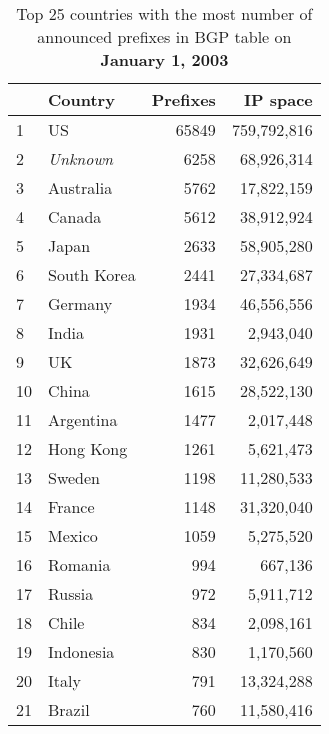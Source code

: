 
\begin{table*}[tp]
\begin{minipage}[t]{0.48\textwidth}
	\begin{center}
	\caption{Top 25 countries with the most number of announced prefixes in BGP table on \textbf{January 1, 2003}}
	\label{tab:top25 bgp prefixes 2003}
	\begin{tabular}{|l||l|r|r|} %
		\hline
		&      \bf Country		&    Prefixes   &       IP space 		\tabularnewline \hline 
1       &       US      		&       65849   &       759,792,816     \tabularnewline %
2       &       \emph{Unknown}	&       6258    &       68,926,314      \tabularnewline %
3       &       Australia       &       5762    &       17,822,159      \tabularnewline %
4       &       Canada  		&       5612    &       38,912,924      \tabularnewline %
5       &       Japan   		&       2633    &       58,905,280      \tabularnewline %
6       &       South Korea     &       2441    &       27,334,687      \tabularnewline %
7       &       Germany			&       1934    &       46,556,556      \tabularnewline %
8       &       India  			&       1931    &       2,943,040       \tabularnewline %
9       &       UK     			&       1873    &       32,626,649      \tabularnewline %
10      &       China  			&       1615    &       28,522,130      \tabularnewline %
11      &       Argentina       &       1477    &       2,017,448       \tabularnewline %
12      &       Hong Kong       &       1261    &       5,621,473       \tabularnewline %
13      &       Sweden  		&       1198    &       11,280,533      \tabularnewline %
14      &       France  		&       1148    &       31,320,040      \tabularnewline %
15      &       Mexico  		&       1059    &       5,275,520       \tabularnewline %
16      &       Romania 		&       994     &       667,136 		\tabularnewline %
17      &       Russia  		&       972     &       5,911,712       \tabularnewline %
18      &       Chile   		&       834     &       2,098,161       \tabularnewline %
19      &       Indonesia       &       830     &       1,170,560       \tabularnewline %
20      &       Italy   		&       791     &       13,324,288      \tabularnewline %
21      &       Brazil  		&       760     &       11,580,416      \tabularnewline %

\end{tabular}
\end{center}
\end{minipage}
\end{table*}
